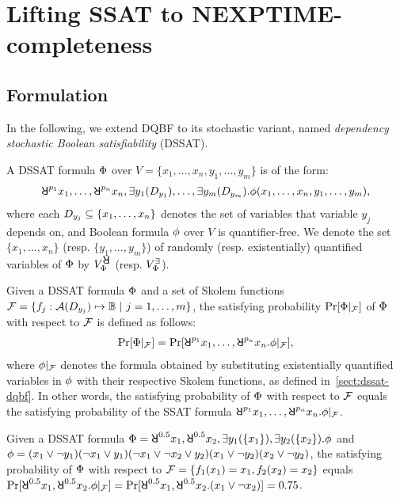 \section{Lifting SSAT to NEXPTIME-completeness}
\label{sect:dssat-technique}

\subsection{Formulation}
In the following, we extend DQBF to its stochastic variant,
named \textit{dependency stochastic Boolean satisfiability} (DSSAT).

A DSSAT formula $\Phi$ over $V=\{x_1,\ldots,x_n,y_1,\ldots,y_m\}$ is of the form:
\begin{align}
    \label{eq:dssat}
    \random{p_1}x_1,\ldots,\random{p_n}x_n,\exists y_1(\dep{y_1}),\ldots,\exists y_m(\dep{y_m}).\pf(x_1,\ldots,x_n,y_1,\ldots,y_m),
\end{align}
where each $D_{y_j}\subseteq\{x_1,\ldots,x_n\}$ denotes the set of variables that variable $y_j$ depends on,
and Boolean formula $\phi$ over $V$ is quantifier-free.
We denote the set $\{x_1,\ldots,x_n\}$ (resp. $\{y_1,\ldots,y_m\}$) of randomly (resp. existentially) quantified variables of $\Phi$ by $\rvs$ (resp. $V_{\Phi}^{\exists}$).

Given a DSSAT formula $\Phi$ and a set of Skolem functions
$\skf=\{f_j:\av{\dep{y_j}}\mapsto\booldom\ |\ j=1,\ldots,m\}$,
the satisfying probability $\Pr[\Phi|_{\mathcal{F}}]$ of $\Phi$ with respect to $\mathcal{F}$ is defined as follows:
\begin{align}\label{eq:dssat-probability}
    \spb{\pcf{\Qf}{\skf}}=\spb{\random{p_1}x_1,\ldots,\random{p_n}x_n.\pcf{\pf}{\skf}},
\end{align}
where $\phi|_{\mathcal{F}}$ denotes the formula obtained by substituting existentially quantified variables in $\phi$ with their respective Skolem functions, as defined in~\cref{sect:dssat-dqbf}.
In other words, the satisfying probability of $\Phi$ with respect to $\mathcal{F}$ equals
the satisfying probability of the SSAT formula $\random{p_1}x_1,\ldots,\random{p_n}x_n.\pcf{\pf}{\skf}$.

\begin{example}
    Given a DSSAT formula $\Qf=\random{0.5}x_1,\random{0.5}x_2,\exists y_1(\{x_1\}),\exists y_2(\{x_2\}).\pf$
    and $\phi=(x_1\lor\lnot y_1)(\lnot x_1\lor y_1)(\lnot x_1\lor\lnot x_2\lor y_2)(x_1\lor\lnot y_2)(x_2\lor\lnot y_2)$,
    the satisfying probability of $\Phi$ with respect to $\mathcal{F}=\{f_1(x_1)=x_1,f_2(x_2)=x_2\}$
    equals $\spb{\random{0.5} x_1,\random{0.5} x_2.\pcf{\pf}{\skf}}=\spb{\random{0.5} x_1,\random{0.5} x_2.(x_1\lor\lnot x_2)}=0.75$.
\end{example}

